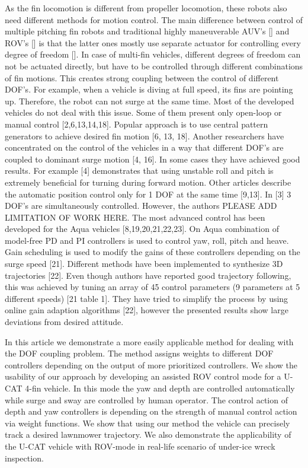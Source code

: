 \documentclass[conference]{IEEEtran}
\begin{document}
As the fin locomotion is different from propeller locomotion, these robots also need different methods for motion control. The main difference between control of multiple pitching fin robots and traditional highly maneuverable AUV's [] and ROV's [] is that the latter ones mostly use separate actuator for controlling every degree of freedom []. In case of multi-fin vehicles, different degrees of freedom can not be actuated directly, but have to be controlled through different combinations of fin motions. This creates strong coupling between the control of different DOF's. For example, when a vehicle is diving at full speed, its fins are pointing up. Therefore, the robot can not surge at the same time. Most of the developed vehicles do not deal with this issue. Some of them present only open-loop or manual control [2,6,13,14,18]. Popular approach is to use central pattern generators to achieve desired fin motion [6, 13, 18]. Another researchers have concentrated on the control of the vehicles in a way that different DOF's are coupled to dominant surge motion [4, 16]. In some cases they have achieved good results. For example [4] demonstrates that using unstable roll and pitch is extremely beneficial for turning during forward motion. Other articles describe the automatic position control only for 1 DOF at the same time [9,13]. In [3] 3 DOF's are simultaneously controlled. However, the authors PLEASE ADD LIMITATION OF WORK HERE. The most advanced control has been developed for the Aqua vehicles [8,19,20,21,22,23]. On Aqua combination of model-free PD and PI controllers is used to control yaw, roll, pitch and heave. Gain scheduling is used to modify the gains of these controllers depending on the surge speed [21]. Different methods have been implemented to synthesize 3D trajectories [22]. Even though authors have reported good trajectory following, this was achieved by tuning an array of 45 control parameters (9 parameters at 5 different speeds) [21 table 1]. They have tried to simplify the process by using online gain adaption algorithms [22], however the presented results show large deviations from desired attitude.

In this article we demonstrate a more easily applicable method for dealing with the DOF coupling problem. The method assigns weights to different DOF controllers depending on the output of more prioritized controllers. We show the usability of our approach by developing an assisted ROV control mode for a U-CAT 4-fin vehicle. In this mode the yaw and depth are controlled automatically while surge and sway are controlled by human operator. The control action of depth and yaw controllers is depending on the strength of manual control action via weight functions. We show that using our method the vehicle can precisely track a desired lawnmower trajectory. We also demonstrate the applicability of the U-CAT vehicle with ROV-mode in real-life scenario of under-ice wreck inspection.
\end{document}
